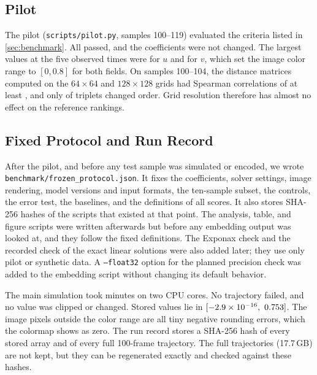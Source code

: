 \subsection{Pilot}
\label{app:pilot}
The pilot (\texttt{scripts/pilot.py}, samples 100--119) evaluated the criteria listed in \cref{sec:benchmark}. All passed, and the coefficients were not changed. The largest values at the five observed times were \pilotMaxU{} for $u$ and \pilotMaxV{} for $v$, which set the image color range to $[0,0.8]$ for both fields. On samples 100--104, the distance matrices computed on the $64\times64$ and $128\times128$ grids had Spearman correlations of at least \pilotSpearmanMin{}, and only \pilotFlips{} of \pilotTriplets{} triplets changed order. Grid resolution therefore has almost no effect on the reference rankings.

\subsection{Fixed Protocol and Run Record}
After the pilot, and before any test sample was simulated or encoded, we wrote \texttt{benchmark/frozen\_protocol.json}. It fixes the coefficients, solver settings, image rendering, model versions and input formats, the ten-sample subset, the controls, the error test, the baselines, and the definitions of all scores. It also stores SHA-256 hashes of the scripts that existed at that point. The analysis, table, and figure scripts were written afterwards but before any embedding output was looked at, and they follow the fixed definitions. The Exponax check and the recorded check of the exact linear solutions were also added later; they use only pilot or synthetic data. A \texttt{--float32} option for the planned precision check was added to the embedding script without changing its default behavior.

The main simulation took \simSeconds{} minutes on two CPU cores. No trajectory failed, and no value was clipped or changed. Stored values lie in $[-2.9\times10^{-16},\ 0.753]$. The \simOOR{} image pixels outside the color range are all tiny negative rounding errors, which the colormap shows as zero. The run record stores a SHA-256 hash of every stored array and of every full 100-frame trajectory. The full trajectories (17.7\,GB) are not kept, but they can be regenerated exactly and checked against these hashes.
